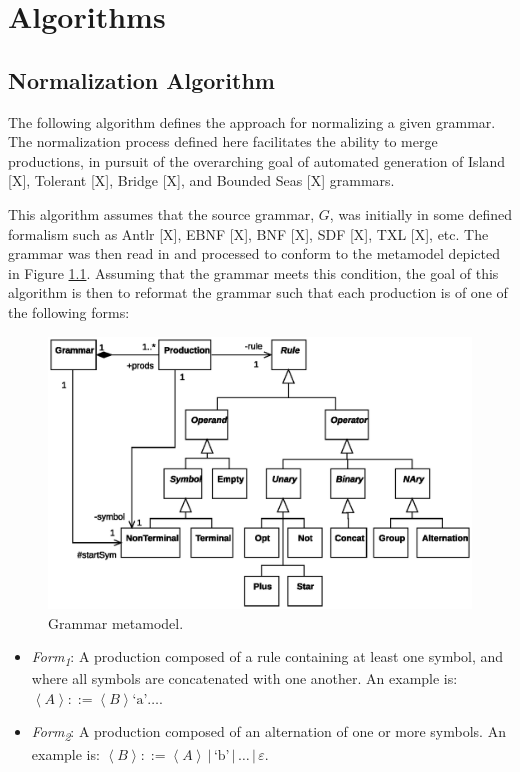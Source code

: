 \documentclass[10pt,nocc]{xrese_report}
\begin{document}
\chapter{Algorithms}

\section{Normalization Algorithm}\label{sec:norm_alg}

The following algorithm defines the approach for normalizing a given grammar. The normalization process defined here facilitates the ability to merge productions, in pursuit of the overarching goal of automated generation of Island [X], Tolerant [X], Bridge [X], and Bounded Seas [X] grammars.

This algorithm assumes that the source grammar, $G$, was initially in some defined formalism such as Antlr [X], EBNF [X], BNF [X], SDF [X], TXL [X], etc. The grammar was then read in and processed to conform to the metamodel depicted in Figure \ref{fig:metamodel}. Assuming that the grammar meets this condition, the goal of this algorithm is then to reformat the grammar such that each production is of one of the following forms:

\begin{figure}
 \begin{center}
  \includegraphics[width=\textwidth]{images/paper/metamodel.eps}
  \caption{Grammar metamodel.}\label{fig:metamodel}
 \end{center}
\end{figure}


\begin{itemize}
 \item \textit{Form\textsubscript{1}}: A production composed of a rule containing at least one symbol, and where all symbols are concatenated with one another. An example is: $\left<A\right> ::= \left<B\right> \textrm{`a'} \ldots$.
 \item \textit{Form\textsubscript{2}}: A production composed of an alternation of one or more symbols. An example is: $\left<B\right> ::= \left<A\right>\,|\,\textrm{`b'}\,|\,\ldots\,|\,\varepsilon$.
\end{itemize}
\end{document}

